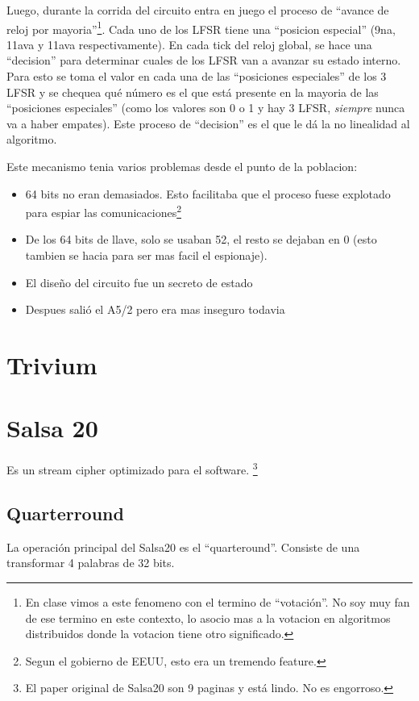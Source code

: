 \documentclass[12pt,a4paper]{report}
\begin{document}
Luego, durante la corrida del circuito entra en juego el proceso de ``avance de reloj por mayoria''\footnote{En clase vimos a este fenomeno con el termino de ``votación''. No soy muy fan de ese termino en este contexto, lo asocio mas a la votacion en algoritmos distribuidos donde la votacion tiene otro significado.}. Cada uno de los LFSR tiene una ``posicion especial'' (9na, 11ava y 11ava respectivamente). En cada tick del reloj global, se hace una ``decision'' para determinar cuales de los LFSR van a avanzar su estado interno. Para esto se toma el valor en cada una de las ``posiciones especiales'' de los 3 LFSR y se chequea qué número es el que está presente en la mayoria de las ``posiciones especiales'' (como los valores son 0 o 1 y hay 3 LFSR, \textit{siempre} nunca va a haber empates). Este proceso de ``decision'' es el que le dá la no linealidad al algoritmo.

Este mecanismo tenia varios problemas desde el punto de la poblacion:
\begin{itemize}
\item 64 bits no eran demasiados. Esto facilitaba que el proceso fuese explotado para espiar las comunicaciones\footnote{Segun el gobierno de EEUU, esto era un tremendo feature.}
\item De los 64 bits de llave, solo se usaban 52, el resto se dejaban en 0 (esto tambien se hacia para ser mas facil el espionaje).
\item El diseño del circuito fue un secreto de estado
\item Despues salió el A5/2 pero era mas inseguro todavia
\end{itemize}

\section{Trivium}
\label{sec:trivium}

\section{Salsa 20}
\label{sec:salsa20}
Es un stream cipher optimizado para el software. \footnote{El paper original de Salsa20 \cite{salsa2005} son 9 paginas y está lindo. No es engorroso.}

\subsection{Quarterround}
La operación principal del Salsa20 es el ``quarteround''. Consiste de una transformar 4 palabras de 32 bits.
\end{document}
